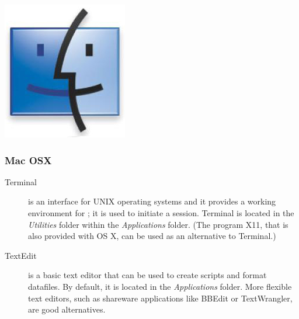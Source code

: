\begin{flushleft}
	\begin{minipage}[c]{0.074\textwidth}
   		\includegraphics[width=\textwidth]{figures/figLogoMac.jpg}
	\end{minipage}%
	\quad
	\begin{minipage}[t]{0.88\textwidth}
	   	\subsubsection{Mac OSX}
	\end{minipage}
			\begin{description}
				\item[Terminal]  is an interface for UNIX operating systems and it
				provides a working environment for \poy; it is used to initiate a
				\poy session. Terminal is located in the \emph{Utilities} folder within
				the \emph{Applications} folder. (The program X11, that is
				also provided with OS X, can be used as an alternative to Terminal.)
				\item[TextEdit] is a basic text editor that can be used to create \poy
				scripts and format datafiles. By default, it is located in the
				\emph{Applications} folder. More flexible text editors, such as
				shareware applications like BBEdit or TextWrangler, are good alternatives.
			\end{description}		


\end{flushleft}
